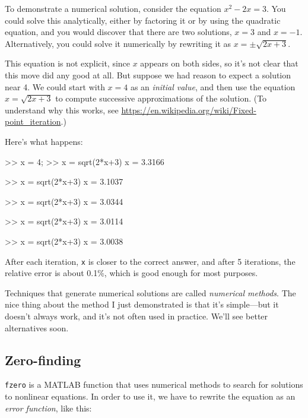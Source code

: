 
To demonstrate a numerical solution, consider the equation $x^2 - 2x =
3$.  You could solve this analytically, either by factoring it or by
using the quadratic equation, and you would discover that there are
two solutions, $x=3$ and $x=-1$.  Alternatively, you could solve it
numerically by rewriting it as $x = \pm \sqrt{2x+3}$.

This equation is not explicit, since $x$ appears on both sides, so
it's not clear that this move did any good at all.  But suppose we had
reason to expect a solution near 4.
We could start with $x=4$ as an {\em initial value}, and then use
the equation $x = \sqrt{2x+3}$ to compute successive
approximations of the solution. (To understand why this
works, see \url{https://en.wikipedia.org/wiki/Fixed-point_iteration}.)


Here's what happens:

\begin{code}
>> x = 4;
>> x = sqrt(2*x+3)
x = 3.3166

>> x = sqrt(2*x+3)
x = 3.1037

>> x = sqrt(2*x+3)
x = 3.0344

>> x = sqrt(2*x+3)
x = 3.0114

>> x = sqrt(2*x+3)
x = 3.0038
\end{code}

After each iteration, {\tt x} is closer to the correct answer,
and after 5 iterations, the relative error is about 0.1\%, which
is good enough for most purposes.


Techniques that generate numerical solutions are called
\emph{numerical methods}.  
The nice thing about the method I
just demonstrated is that it's simple---but it doesn't always
work, and it's not often used in practice.
We'll see better alternatives soon.

\subsection{Zero-finding}
\label{zero}


{\tt fzero} is a MATLAB function that uses numerical methods to search for solutions to nonlinear equations.  In order to use it, we have to rewrite the equation as an {\em error function}, like this:


